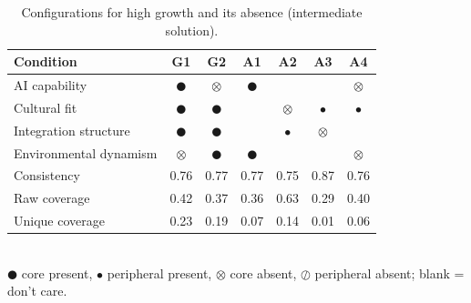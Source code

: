 \begin{table}[htbp]\centering
\caption{Configurations for high growth and its absence (intermediate solution).}
\begin{tabular}{lcccccc}
\toprule
Condition & G1 & G2 & A1 & A2 & A3 & A4 \\
\midrule
AI capability & $\CIRCLE$ & $\otimes$ & $\CIRCLE$ &  &  & $\otimes$ \\
Cultural fit & $\CIRCLE$ & $\CIRCLE$ &  & $\otimes$ & $\bullet$ & $\bullet$ \\
Integration structure & $\CIRCLE$ & $\CIRCLE$ &  & $\bullet$ & $\otimes$ &  \\
Environmental dynamism & $\otimes$ & $\CIRCLE$ & $\CIRCLE$ &  &  & $\otimes$ \\
\midrule
Consistency & 0.76 & 0.77 & 0.77 & 0.75 & 0.87 & 0.76 \\
Raw coverage & 0.42 & 0.37 & 0.36 & 0.63 & 0.29 & 0.40 \\
Unique coverage & 0.23 & 0.19 & 0.07 & 0.14 & 0.01 & 0.06 \\
\bottomrule
\end{tabular}
\\[2pt]\footnotesize $\CIRCLE$ core present, $\bullet$ peripheral present, $\otimes$ core absent, $\oslash$ peripheral absent; blank = don't care.
\end{table}
